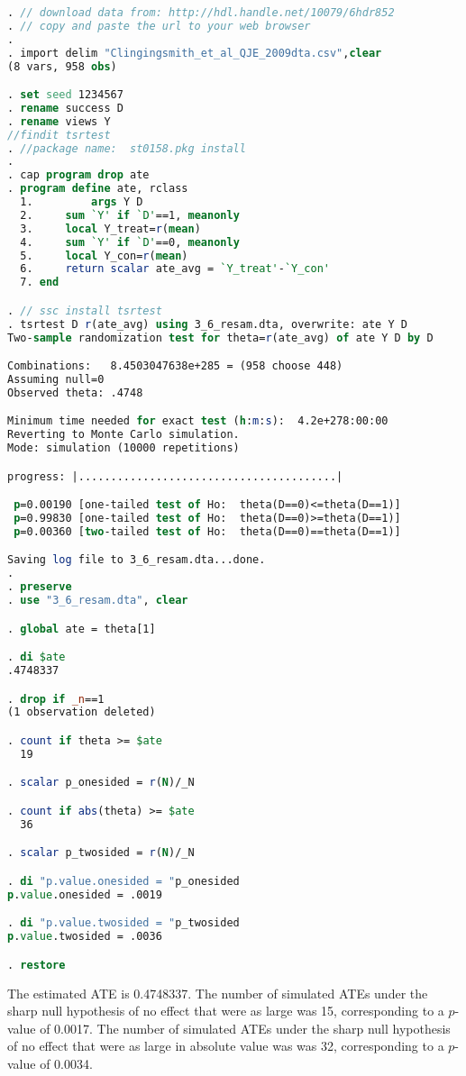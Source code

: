 \documentclass[11pt,notitlepage]{article}\usepackage[]{graphicx}\usepackage[]{color}
\begin{document}
\begin{lstlisting}[language=stata]
. // download data from: http://hdl.handle.net/10079/6hdr852
. // copy and paste the url to your web browser
. 
. import delim "Clingingsmith_et_al_QJE_2009dta.csv",clear
(8 vars, 958 obs)

. set seed 1234567
. rename success D
. rename views Y
//findit tsrtest
. //package name:  st0158.pkg install
. 
. cap program drop ate
. program define ate, rclass
  1.         args Y D
  2.     sum `Y' if `D'==1, meanonly
  3.     local Y_treat=r(mean)
  4.     sum `Y' if `D'==0, meanonly
  5.     local Y_con=r(mean)
  6.     return scalar ate_avg = `Y_treat'-`Y_con'
  7. end

. // ssc install tsrtest
. tsrtest D r(ate_avg) using 3_6_resam.dta, overwrite: ate Y D
Two-sample randomization test for theta=r(ate_avg) of ate Y D by D

Combinations:   8.4503047638e+285 = (958 choose 448)
Assuming null=0
Observed theta: .4748

Minimum time needed for exact test (h:m:s):  4.2e+278:00:00
Reverting to Monte Carlo simulation.
Mode: simulation (10000 repetitions)

progress: |........................................|

 p=0.00190 [one-tailed test of Ho:  theta(D==0)<=theta(D==1)]
 p=0.99830 [one-tailed test of Ho:  theta(D==0)>=theta(D==1)]
 p=0.00360 [two-tailed test of Ho:  theta(D==0)==theta(D==1)]

Saving log file to 3_6_resam.dta...done.
.   
. preserve 
. use "3_6_resam.dta", clear

. global ate = theta[1]

. di $ate
.4748337

. drop if _n==1
(1 observation deleted)

. count if theta >= $ate
  19

. scalar p_onesided = r(N)/_N

. count if abs(theta) >= $ate
  36

. scalar p_twosided = r(N)/_N

. di "p.value.onesided = "p_onesided
p.value.onesided = .0019

. di "p.value.twosided = "p_twosided 
p.value.twosided = .0036

. restore
\end{lstlisting}


The estimated ATE is 0.4748337.  The number of simulated ATEs under the sharp null hypothesis of no effect that were as large was 15, corresponding to a $p$-value of 0.0017.  The number of simulated ATEs under the sharp null hypothesis of no effect that were as large in absolute value was  was 32, corresponding to a $p$-value of 0.0034.
\end{document}
